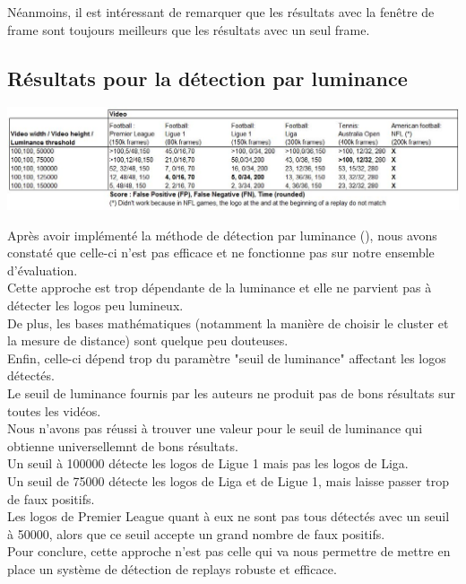\documentclass[11pt]{article}
\begin{document}
Néanmoins, il est intéressant de remarquer que les résultats avec la fenêtre de frame sont toujours meilleurs que les résultats avec un seul frame.\\
\subsection{Résultats pour la détection par luminance}
\label{sec:orgcd3517c}
\begin{center}
\includegraphics[width=15cm]{robust_res.JPG}
\end{center}
Après avoir implémenté la méthode de détection par luminance (\cite{xu11_robus_replay_detec_algor_soccer_video}), nous avons constaté que celle-ci n'est pas efficace et ne fonctionne pas sur notre ensemble d'évaluation.\\
Cette approche est trop dépendante de la luminance et elle ne parvient pas à détecter les logos peu lumineux.\\
De plus, les bases mathématiques (notamment la manière de choisir le cluster et la mesure de distance) sont quelque peu douteuses.\\
Enfin, celle-ci dépend trop du paramètre "seuil de luminance" affectant les logos détectés.\\
Le seuil de luminance fournis par les auteurs ne produit pas de bons résultats sur toutes les vidéos.\\
Nous n'avons pas réussi à trouver une valeur pour le seuil de luminance qui obtienne universellemnt de bons résultats.\\
Un seuil à 100000 détecte les logos de Ligue 1 mais pas les logos de Liga.\\
Un seuil de 75000 détecte les logos de Liga et de Ligue 1, mais laisse passer trop de faux positifs.\\
Les logos de Premier League quant à eux ne sont pas tous détectés avec un seuil à 50000, alors que ce seuil accepte un grand nombre de faux positifs.\\

Pour conclure, cette approche n'est pas celle qui va nous permettre de mettre en place un système de détection de replays robuste et efficace.\\
\end{document}
